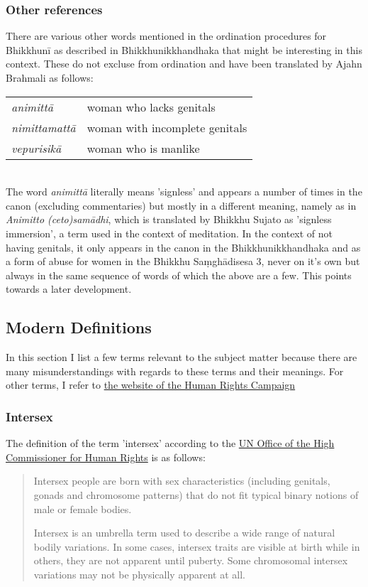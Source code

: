 \subsubsection{Other references}
There are various other words mentioned in the ordination procedures for Bhikkhunī as described in Bhikkhunikkhandhaka that might be interesting in this context. These do not excluse from ordination and have been translated by Ajahn Brahmali as follows: \\

\begin{tabular}{ l l }
 {\em animittā } & woman who lacks genitals \\
 {\em nimittamattā } & woman with incomplete genitals \\ 
 {\em vepurisikā } & woman who is manlike \\
\end{tabular} \\

The word {\em animittā} literally means 'signless' and appears a number of times in the canon (excluding commentaries) but mostly in a different meaning, namely as in {\em Animitto (ceto)samādhi}, which is translated by Bhikkhu Sujato as 'signless immersion', a term used in the context of meditation. In the context of not having genitals, it only appears in the canon in the Bhikkhunikkhandhaka and as a form of abuse for women in the Bhikkhu Saṃ­ghā­di­sesa­ 3, never on it's own but always in the same sequence of words of which the above are a few. This points towards a later development.


\subsection{Modern Definitions}
In this section I list a few terms relevant to the subject matter because there are many misunderstandings with regards to these terms and their meanings. For other terms, I refer to \href{https://www.hrc.org/resources/glossary-of-terms}{the website of the Human Rights Campaign}

\subsubsection{Intersex}
\label{intersex}
The definition of the term 'intersex' according to the \href{https://unfe.org/system/unfe-65-Intersex_Factsheet_ENGLISH.pdf}{UN Office of the High Commissioner for Human Rights} is as follows:

\begin{quote}
Intersex people are born with sex characteristics (including genitals, gonads and chromosome patterns) that do not fit typical binary notions of male or female bodies.

Intersex is an umbrella term used to describe a wide range of natural bodily variations. In some cases, intersex traits are visible at birth while in others, they are not apparent until puberty. Some chromosomal intersex variations may not be physically apparent at all.
\end{quote}

